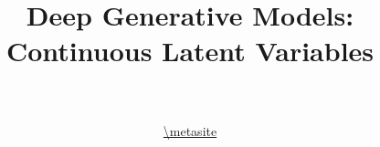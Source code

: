 \documentclass[14pt]{beamer}
\title[VAEs]{Deep Generative Models: \\
Continuous Latent Variables}
\date{}
\author[VI Tutorial @ \metahost]{ \metaauthor \\ 
~\\
\url{\metasite}
}
\institute[]{\metaack}
\begin{document}
\frame{\titlepage}

\frame{\tableofcontents}


\end{document}
